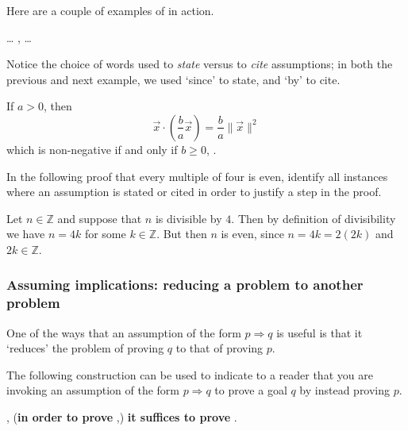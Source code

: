 Here are a couple of examples of  in action.

\begin{extract}
\label{xtrSoExample}
\dots{} ,  \dots{}
\end{extract}

Notice the choice of words used to \textit{state} versus to \textit{cite} assumptions; in both the previous and next example, we used `since' to state, and `by' to cite.

\begin{extract}
\label{xtrSoExampleTwo}
If $a>0$, then 
\[ \vec x \cdot \left( \frac{b}{a} \vec x \right) = \frac{b}{a} \lVert \vec x \rVert^2 \]
which is non-negative if and only if $b \ge 0$, .
\end{extract}

\begin{exercise}
In the following proof that every multiple of four is even, identify all instances where an assumption is stated or cited in order to justify a step in the proof.

\begin{snippet}
Let $n \in \mathbb{Z}$ and suppose that $n$ is divisible by $4$. Then by definition of divisibility we have $n=4k$ for some $k \in \mathbb{Z}$. But then $n$ is even, since $n = 4k = 2(2k)$ and $2k \in \mathbb{Z}$.
\end{snippet}
\end{exercise}

\subsubsection*{Assuming implications: reducing a problem to another problem}

One of the ways that an assumption of the form $p \Rightarrow q$ is useful is that it `reduces' the problem of proving $q$ to that of proving $p$.

\begin{vocabulary}
\label{vcbAssumingImplications}
The following construction can be used to indicate to a reader that you are invoking an assumption of the form $p \Rightarrow q$ to prove a goal $q$ by instead proving $p$.

\begin{vocabtemplate}
, (\textbf{in order to prove} ,) \textbf{it suffices to prove} .
\end{vocabtemplate}
\end{vocabulary}

